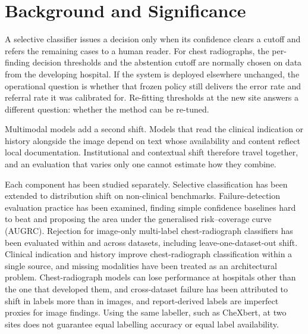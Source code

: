 \section*{Background and Significance}

A selective classifier issues a decision only when its confidence clears a
cutoff and refers the remaining cases to a human reader.\cite{chow1970,geifman2017} For chest
radiographs, the per-finding decision thresholds and the abstention cutoff are
normally chosen on data from the developing hospital. If the system is deployed
elsewhere unchanged, the operational question is whether that frozen policy
still delivers the error rate and referral rate it was calibrated for.
Re-fitting thresholds at the new site answers a different question: whether the
method can be re-tuned.

Multimodal models add a second shift. Models that read the clinical indication
or history alongside the image depend on text whose availability and content
reflect local documentation. Institutional and contextual shift therefore
travel together, and an evaluation that varies only one cannot estimate how
they combine.

Each component has been studied separately. Selective classification has been
extended to distribution shift on non-clinical benchmarks.\cite{liang2024}
Failure-detection evaluation practice has been examined, finding simple
confidence baselines hard to beat and proposing the area under the generalised
risk--coverage curve (AUGRC).\cite{jaeger2023,traub2024,bernhardt2022}
Rejection for image-only multi-label chest-radiograph classifiers has been
evaluated within and across datasets, including leave-one-dataset-out
shift.\cite{aperstein2026} Clinical indication
and history improve chest-radiograph classification within a single
source,\cite{jacenkow2022,yang2025} and missing modalities have been treated as
an architectural problem.\cite{wang2025} Chest-radiograph models can lose
performance at hospitals other than the one that developed them,\cite{zech2018}
and cross-dataset failure has been attributed to shift in labels more than in
images,\cite{cohen2020} and report-derived labels are imperfect proxies for
image findings.\cite{jain2021} Using the same labeller, such as
CheXbert,\cite{smit2020} at two sites does not guarantee equal labelling
accuracy or equal label availability.

